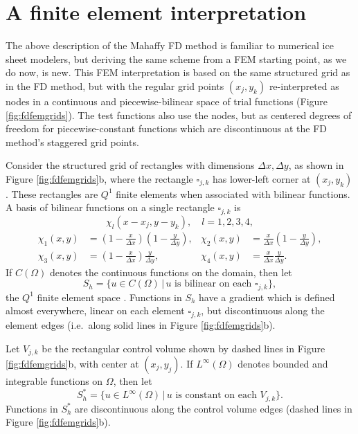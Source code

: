 \documentclass[11pt]{amsart}
\begin{document}
\section{A finite element interpretation}

The above description of the Mahaffy FD method is familiar to numerical ice sheet modelers, but deriving the same scheme from a FEM starting point, as we do now, is new.  This FEM interpretation is based on the same structured grid as in the FD method, but with the regular grid points $(x_j,y_k)$ re-interpreted as nodes in a continuous and piecewise-bilinear space of trial functions (Figure \ref{fig:fdfemgrids}).  The test functions also use the nodes, but as centered degrees of freedom for piecewise-constant functions which are discontinuous at the FD method's staggered grid points.

Consider the structured grid of rectangles with dimensions $\Delta x,\Delta y$, as shown in Figure \ref{fig:fdfemgrids}b, where the rectangle $\square_{j,k}$ has lower-left corner at $(x_j,y_k)$.  These rectangles are $Q^1$ finite elements when associated with bilinear functions.  A basis of bilinear functions on a single rectangle $\square_{j,k}$ is
\begin{equation}
\chi_l(x-x_j,y-y_k), \quad l=1,2,3,4,
\end{equation}
\begin{align*}
\chi_1(x,y) &= \left(1-\tfrac{x}{\Delta x}\right) \left(1-\tfrac{y}{\Delta y}\right), & \chi_2(x,y) &= \tfrac{x}{\Delta x} \left(1-\tfrac{y}{\Delta y}\right), \\
\chi_3(x,y) &= \left(1-\tfrac{x}{\Delta x}\right) \tfrac{y}{\Delta y}, & \chi_4(x,y) &= \tfrac{x}{\Delta x} \tfrac{y}{\Delta y}. 
\end{align*}
If $C(\Omega)$ denotes the continuous functions on the domain, then let
\begin{equation}
S_h = \{u \in C(\Omega) \,\big|\, u \text{ is bilinear on each $\square_{j,k}$}\},
\end{equation}
the $Q^1$ finite element space \cite{Elmanetal2005}.  Functions in $S_h$ have a gradient which is defined almost everywhere, linear on each element $\square_{j,k}$, but discontinuous along the element edges (i.e.~along solid lines in Figure \ref{fig:fdfemgrids}b).

Let $V_{j,k}$ be the rectangular control volume shown by dashed lines in Figure \ref{fig:fdfemgrids}b, with center at $(x_j,y_j)$.  If $L^\infty(\Omega)$ denotes bounded and integrable functions on $\Omega$, then let
\begin{equation}
S_h^* = \{u \in L^\infty(\Omega) \,\big|\, u \text{ is constant on each $V_{j,k}$}\}.
\end{equation}
Functions in $S_h^*$ are discontinuous along the control volume edges (dashed lines in Figure \ref{fig:fdfemgrids}b).
\end{document}
